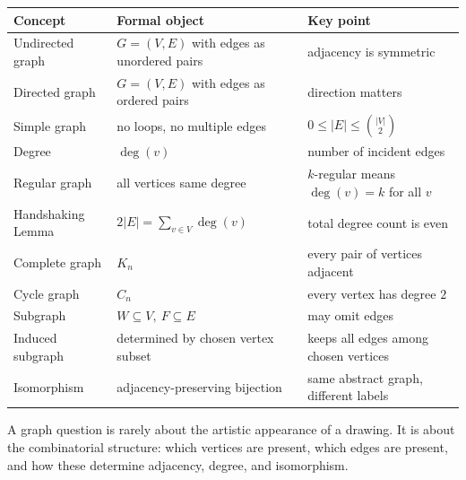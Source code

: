 \begin{center}
\small
\begin{tabular}{@{}p{}p{}p{}@{}}
\toprule
\textbf{Concept} & \textbf{Formal object} & \textbf{Key point} \\
\midrule
Undirected graph & \(G=(V,E)\) with edges as unordered pairs & adjacency is symmetric \\
Directed graph & \(G=(V,E)\) with edges as ordered pairs & direction matters \\
Simple graph & no loops, no multiple edges & \(0\le |E|\le \binom{|V|}{2}\) \\
Degree & \(\deg(v)\) & number of incident edges \\
Regular graph & all vertices same degree & \(k\)-regular means \(\deg(v)=k\) for all \(v\) \\
Handshaking Lemma & \(2|E|=\sum_{v\in V}\deg(v)\) & total degree count is even \\
Complete graph & \(K_n\) & every pair of vertices adjacent \\
Cycle graph & \(C_n\) & every vertex has degree \(2\) \\
Subgraph & \(W\subseteq V,\ F\subseteq E\) & may omit edges \\
Induced subgraph & determined by chosen vertex subset & keeps all edges among chosen vertices \\
Isomorphism & adjacency-preserving bijection & same abstract graph, different labels \\
\bottomrule
\end{tabular}
\end{center}

\begin{commonmistake}[title={Final warning for Handout 07}]
A graph question is rarely about the artistic appearance of a drawing. It is about the combinatorial structure: which vertices are present, which edges are present, and how these determine adjacency, degree, and isomorphism.
\end{commonmistake}
